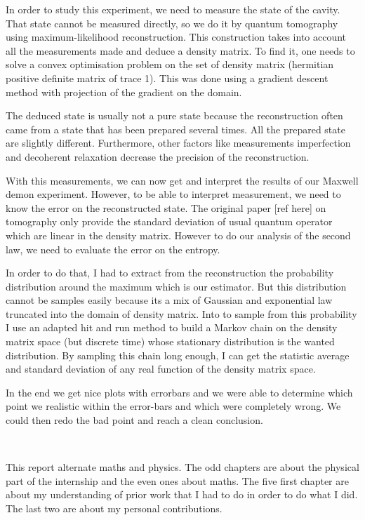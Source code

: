 \documentclass[10pt]{report}
\theoremstyle{plain}
\theoremstyle{definition}
\theoremstyle{remark}
\begin{document}
In order to study this experiment, we need to measure the state of the cavity.
That state cannot be measured directly, so we do it by quantum tomography using
maximum-likelihood reconstruction. This construction takes into account all the
measurements made and deduce a density matrix. To find it, one needs to solve a
convex optimisation problem on the set of density matrix (hermitian positive
definite matrix of trace 1). This was done using a gradient descent method with
projection of the gradient on the domain.

The deduced state is usually not a pure state because the reconstruction often
came from a state that has been prepared several times.
All the prepared state are slightly different.
Furthermore, other factors like measurements imperfection and decoherent
relaxation decrease the precision of the reconstruction.

With this measurements, we can now get and interpret the results of our Maxwell
demon experiment. However, to be able to interpret measurement, we need to know
the error on the reconstructed state. The original paper [ref here] on
tomography only provide the standard deviation of usual quantum operator which
are linear in the density matrix. However to do our analysis of the second law,
we need to evaluate the error on the entropy.

In order to do that, I had to extract from the reconstruction the probability
distribution around the maximum which is our estimator. But this distribution
cannot be samples easily because its a mix of Gaussian and exponential law
truncated into the domain of density matrix. Into to sample from this
probability I use an adapted hit and run method to build a Markov chain on the
density matrix space (but discrete time) whose stationary distribution is the
wanted distribution. By sampling this chain long enough, I can get the statistic
average and standard deviation of any real function of the density matrix space.

In the end we get nice plots with errorbars and we were able to determine which
point we realistic within the error-bars and which were completely wrong. We
could then redo the bad point and reach a clean conclusion.

\

This report alternate maths and physics. The odd chapters are about the physical
part of the internship and the even ones about maths. The five first chapter are
about my understanding of prior work that I had to do in order to do what I did.
The last two are about my personal contributions.
\end{document}
